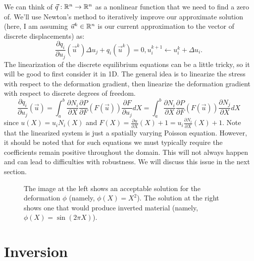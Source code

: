 We can think of $\vec{q} : \mathbb{R}^n \to \mathbb{R}^n$ as a nonlinear function that we need to find a zero of. We'll use Newton's method to iteratively improve our approximate solution (here, I am assuming $\vec{u}^k \in \mathbb{R}^n$ is our current approximation to the vector of discrete displacements) as:
\begin{subequations}
\begin{equation*}
\frac{\partial q_i}{\partial u_j} \left( \vec{u}^k \right) \Delta{u}_j + q_i \left( \vec{u}^k \right) = 0,
\end{equation*}
\begin{equation*}
u_i^{k+1} \leftarrow u_i^{k} + \Delta{u}_i.
\end{equation*}
\end{subequations}
The linearization of the discrete equilibrium equations can be a little tricky, so it will be good to first consider it in 1D. The general idea is to linearize the stress with respect to the deformation gradient, then linearize the deformation gradient with respect to discrete degrees of freedom.
\begin{equation*}
\frac{\partial q_i}{\partial u_j} \left( \vec{u} \right) = \int_a^b \frac{\partial N_i}{\partial X} \frac{\partial P}{\partial F} \left( F \left( \vec{u} \right) \right) \frac{\partial F}{\partial u_j} dX = \int_a^b \frac{\partial N_i}{\partial X} \frac{\partial P}{\partial F} \left( F \left( \vec{u} \right) \right) \frac{\partial N_j}{\partial X} dX
\end{equation*}
since $u(X) = u_i N_i(X)$ and $F(X) = \frac{\partial u}{\partial X}(X) + 1 = u_i \frac{\partial N_i}{\partial X}(X) + 1$. Note that the linearized system is just a spatially varying Poisson equation. However, it should be noted that for such equations we must typically require the coefficients remain positive throughout the domain. This will not always happen and can lead to difficulties with robustness. We will discuss this issue in the next section.

\begin{figure}
\caption{The image at the left shows an acceptable solution for the deformation $\phi$ (namely, $\phi(X) = X^2$). The solution at the right shows one that would produce inverted material (namely, $\phi(X) = \sin \left( 2 \pi X \right)$).}
\label{fig:inversion}
\end{figure}

\section*{Inversion}


